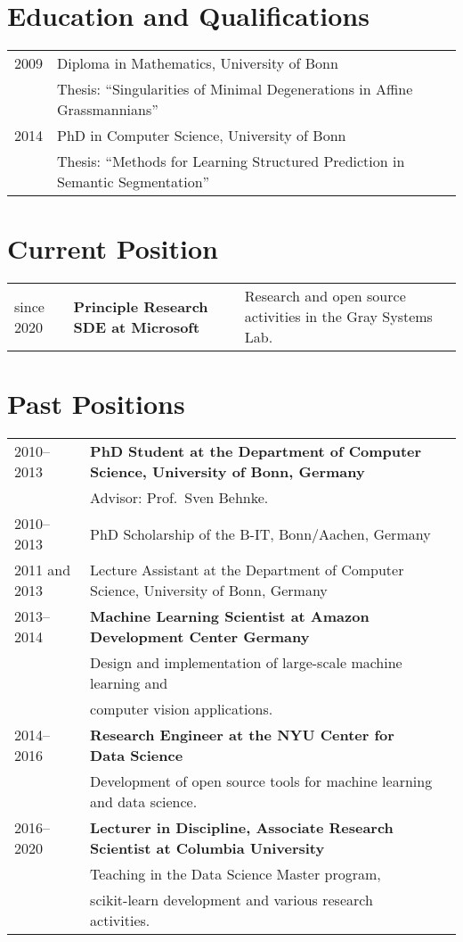 \documentclass[a4paper,11pt]{article}
\begin{document}
\maketitle

\section{Education and Qualifications}
\begin{tabular}{lll}
    2009 & Diploma in Mathematics,  University of Bonn\\
         & Thesis: ``Singularities of Minimal Degenerations in Affine Grassmannians'' \\
    2014 & PhD in Computer Science, University of Bonn \\
         & Thesis: ``Methods for Learning Structured Prediction in Semantic Segmentation''
\end{tabular}

\section{Current Position}
\begin{tabular}{lll}
    since 2020 & \textbf{Principle Research SDE at Microsoft}
               & Research and open source activities in the Gray Systems Lab.
\end{tabular}

\section{Past Positions}
\begin{tabular}{lll}
    2010--2013 & \textbf{PhD Student at the Department of Computer Science, University of Bonn, Germany}\\
         & Advisor: Prof.\ Sven Behnke. \\
    2010--2013 & PhD Scholarship of the B-IT, Bonn/Aachen, Germany\\
    2011 and 2013& Lecture Assistant at the Department of Computer Science, University of Bonn, Germany \\
    2013--2014 & \textbf{Machine Learning Scientist at Amazon Development Center Germany}\\
              & Design and implementation of large-scale machine learning and\\
              & computer vision applications.\\
    2014--2016 & \textbf{Research Engineer at the NYU Center for Data Science}\\
               & Development of open source tools for machine learning and data science.\\
    2016--2020 & \textbf{Lecturer in Discipline, Associate Research Scientist at Columbia University}\\
               & Teaching in the Data Science Master program, \\
               & scikit-learn development and various research activities.
\end{tabular}
\end{document}

